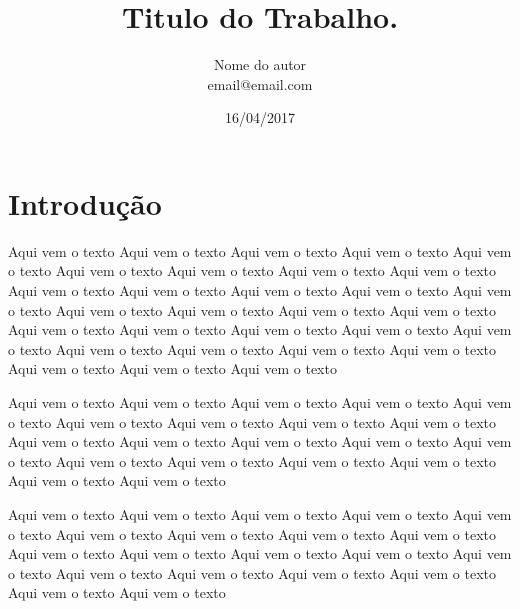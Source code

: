 \documentclass[a4paper, 12pt]{article}
\title{Titulo do Trabalho.}
\author{Nome do autor \\ email@email.com}
\date{16/04/2017}
\begin{document}
\maketitle 



\section{Introdução}
Aqui vem o texto Aqui vem o texto Aqui vem o texto Aqui vem o texto Aqui vem o texto 
Aqui vem o texto Aqui vem o texto Aqui vem o texto Aqui vem o texto Aqui vem o texto 
Aqui vem o texto Aqui vem o texto Aqui vem o texto Aqui vem o texto Aqui vem o texto 
Aqui vem o texto Aqui vem o texto Aqui vem o texto Aqui vem o texto Aqui vem o texto 
Aqui vem o texto Aqui vem o texto Aqui vem o texto Aqui vem o texto Aqui vem o texto 
Aqui vem o texto Aqui vem o texto Aqui vem o texto Aqui vem o texto Aqui vem o texto 


Aqui vem o texto Aqui vem o texto Aqui vem o texto Aqui vem o texto Aqui vem o texto 
Aqui vem o texto Aqui vem o texto Aqui vem o texto Aqui vem o texto Aqui vem o texto 
Aqui vem o texto Aqui vem o texto Aqui vem o texto Aqui vem o texto Aqui vem o texto 
Aqui vem o texto Aqui vem o texto Aqui vem o texto Aqui vem o texto Aqui vem o texto\cite{BlaiseLab} 

Aqui vem o texto Aqui vem o texto Aqui vem o texto Aqui vem o texto Aqui vem o texto 
Aqui vem o texto Aqui vem o texto Aqui vem o texto Aqui vem o texto Aqui vem o texto 
Aqui vem o texto Aqui vem o texto Aqui vem o texto Aqui vem o texto Aqui vem o texto 
Aqui vem o texto Aqui vem o texto Aqui vem o texto Aqui vem o texto Aqui vem o texto 
\cite{BabHer2000}

\newpage
 

\end{document}
